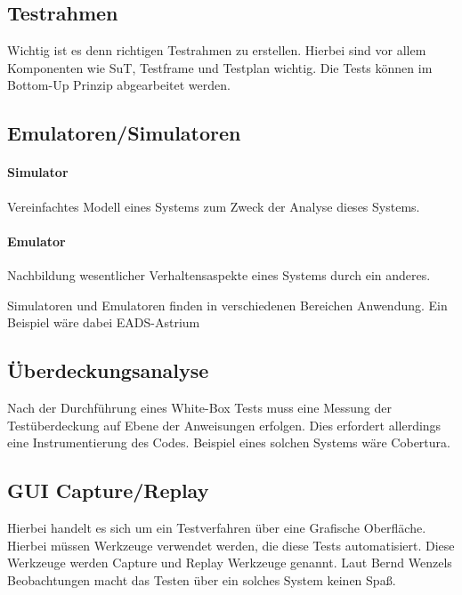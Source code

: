 \subsection{Testrahmen}
Wichtig ist es denn richtigen Testrahmen zu erstellen. Hierbei sind vor allem Komponenten wie SuT, Testframe und Testplan wichtig. Die Tests können im Bottom-Up Prinzip abgearbeitet werden.

\subsection{Emulatoren/Simulatoren}
\paragraph{Simulator}
Vereinfachtes Modell eines Systems zum Zweck der Analyse dieses Systems.
\paragraph{Emulator}
Nachbildung wesentlicher Verhaltensaspekte eines Systems durch ein anderes.

Simulatoren und Emulatoren finden in verschiedenen Bereichen Anwendung. Ein Beispiel wäre dabei EADS-Astrium

\subsection{Überdeckungsanalyse}
Nach der Durchführung eines White-Box Tests muss eine Messung der Testüberdeckung auf Ebene der Anweisungen erfolgen. Dies erfordert allerdings eine Instrumentierung des Codes. Beispiel eines solchen Systems wäre Cobertura.

\subsection{GUI Capture/Replay}
Hierbei handelt es sich um ein Testverfahren über eine Grafische Oberfläche. Hierbei müssen Werkzeuge verwendet werden, die diese Tests automatisiert. Diese Werkzeuge werden Capture und Replay Werkzeuge genannt. Laut Bernd Wenzels Beobachtungen macht das Testen über ein solches System keinen Spaß. 